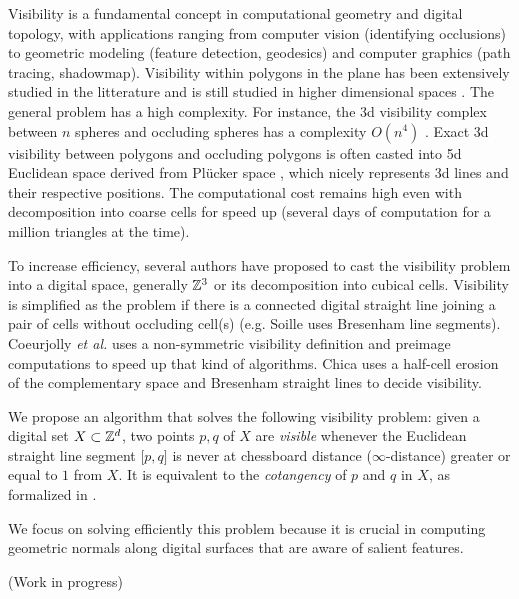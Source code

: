 \documentclass[runningheads]{llncs}
\begin{document}
    Visibility is a fundamental concept in computational geometry and
    digital topology, with applications ranging from computer vision
    (identifying occlusions) to geometric modeling (feature detection, geodesics)
    and computer graphics (path tracing, shadowmap). Visibility within
    polygons in the plane has been extensively studied in the
    litterature \cite{ghosh:2007-book} and is still studied in higher
    dimensional spaces \cite{orourke:2017-book}. The general problem
    has a high complexity. For instance, the 3d visibility complex
    between $n$ spheres and occluding spheres has a complexity
    $O(n^4)$ \cite{durand:2002-tog}. Exact 3d visibility between
    polygons and occluding polygons is often casted into 5d Euclidean
    space derived from Plücker space \cite{nirenstein:2002-ewr}, which
    nicely represents 3d lines and their respective positions. The
    computational cost remains high even with decomposition into
    coarse cells for speed up (several days of computation for a
    million triangles at the time).

    To increase efficiency, several authors have proposed to cast the
    visibility problem into a digital space, generally $\mathbb{Z}^3$ or its
    decomposition into cubical cells. Visibility is simplified as the
    problem if there is a connected digital straight line joining a
    pair of cells without occluding cell(s) (e.g. Soille
    \cite{soille:1994-prl} uses Bresenham line segments). Coeurjolly
    \emph{et al.} \cite{coeurjolly:2004-prl} uses a non-symmetric
    visibility definition and preimage computations to speed up that
    kind of algorithms. Chica \cite{chica:2008-spm} uses a half-cell
    erosion of the complementary space and Bresenham straight lines to
    decide visibility.
    
    We propose an algorithm that solves the following visibility
    problem: given a digital set $X \subset \mathbb{Z}^d$, two points $p,q$ of
    $X$ are \emph{visible} whenever the Euclidean straight line
    segment $\lbrack p,q \rbrack$ is never at chessboard distance
    ($\infty$-distance) greater or equal to $1$ from $X$. It is
    equivalent to the \emph{cotangency} of $p$ and $q$ in $X$, as
    formalized in \cite{lachaud:2021-dgmm,lachaud:2022-jmiv}.

    We focus on solving efficiently this problem because it is crucial
    in computing geometric normals along digital surfaces that are
    aware of salient features.
    
    (Work in progress)
\end{document}
